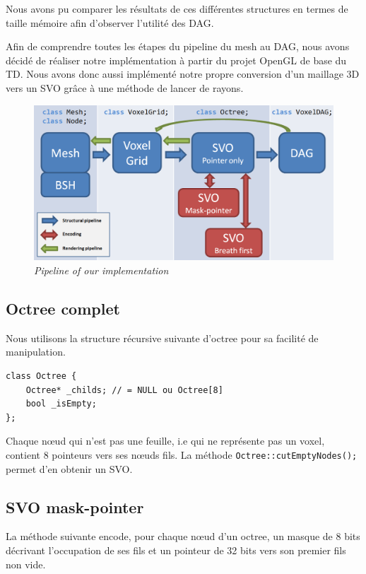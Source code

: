 \documentclass[a4paper]{article}
\begin{document}
Nous avons pu comparer les résultats de ces différentes structures en termes de taille mémoire afin d'observer l'utilité des DAG.


Afin de comprendre toutes les étapes du pipeline du mesh au DAG, nous avons décidé de réaliser notre implémentation à partir du projet OpenGL de base du TD. Nous avons donc aussi implémenté notre propre conversion d’un maillage 3D vers un SVO grâce à une méthode de lancer de rayons.

\begin{figure}
\centering
\includegraphics[width=1\textwidth]{ClassGraph.png}
\caption{\label{fig:triceratops}\textit{Pipeline of our implementation}}
\end{figure}

\subsection{Octree complet}

Nous utilisons la structure récursive suivante d’octree pour sa facilité de manipulation.

\begin{lstlisting}
class Octree {
	Octree* _childs; // = NULL ou Octree[8]
	bool _isEmpty;
};
\end{lstlisting}

Chaque nœud qui n’est pas une feuille, i.e qui ne représente pas un voxel, contient 8 pointeurs vers ses nœuds fils. La méthode \texttt{Octree::cutEmptyNodes();} permet d’en obtenir un SVO. 

\subsection{SVO mask-pointer}

La méthode suivante encode, pour chaque nœud d'un octree, un masque de 8 bits décrivant l’occupation de ses fils et un pointeur de 32 bits vers son premier fils non vide. 
\end{document}
